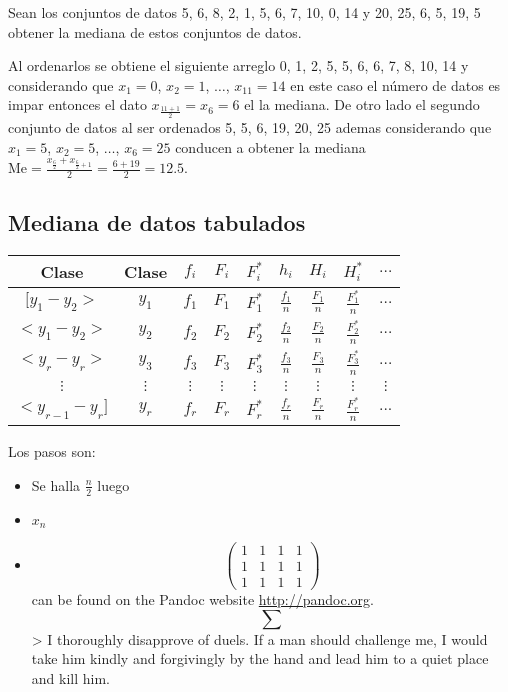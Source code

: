 \documentclass[10pt,]{krantz}
\providecommand{\tightlist}{%
  \setlength{\itemsep}{0pt}\setlength{\parskip}{0pt}}
\theoremstyle{definition}
\theoremstyle{definition}
\theoremstyle{definition}
\theoremstyle{remark}
\let\BeginKnitrBlock\begin \let\EndKnitrBlock\end
\begin{document}
\BeginKnitrBlock{exercise}
\protect\hypertarget{exr:unnamed-chunk-7}{}{\label{exr:unnamed-chunk-7} }Sean los conjuntos de datos 5, 6, 8, 2, 1, 5, 6, 7, 10, 0, 14 y 20, 25, 6, 5, 19, 5 obtener la mediana de estos conjuntos de datos.
\EndKnitrBlock{exercise}

\BeginKnitrBlock{solution}
\iffalse{} {Solución. } \fi{}Al ordenarlos se obtiene el siguiente arreglo 0, 1, 2, 5, 5, 6, 6, 7, 8, 10, 14 y considerando que \(x_1=0\), \(x_2=1\), \(\ldots\), \(x_{11}=14\) en este caso el número de datos es impar entonces el dato \(x_{\frac{11+1}{2}}=x_{6}=6\) el la mediana. De otro lado el segundo conjunto de datos al ser ordenados 5, 5, 6, 19, 20, 25 ademas considerando que \(x_1=5\), \(x_2=5\), \(\ldots\), \(x_6=25\) conducen a obtener la mediana \(\text{Me}=\frac{x_{\frac{6}{2}}+x_{\frac{6}{2}+1}}{2}=\frac{6+19}{2}=12.5\).
\EndKnitrBlock{solution}

\hypertarget{mediana-de-datos-tabulados}{%
\subsection{Mediana de datos tabulados}\label{mediana-de-datos-tabulados}}

\begin{longtable}[]{@{}ccccccccc@{}}
\toprule
Clase & Clase & \(f_i\) & \(F_i\) & \(F_i^*\) & \(h_i\) & \(H_i\) & \(H_i^*\) & \(\ldots\)\tabularnewline
\midrule
\endhead
\([y_1-y_2>\) & \(y_1\) & \(f_1\) & \(F_1\) & \(F_1^*\) & \(\frac{f_1}{n}\) & \(\frac{F_1}{n}\) & \(\frac{F_1^*}{n}\) & \(\ldots\)\tabularnewline
\(<y_1-y_2>\) & \(y_2\) & \(f_2\) & \(F_2\) & \(F_2^*\) & \(\frac{f_2}{n}\) & \(\frac{F_2}{n}\) & \(\frac{F_2^*}{n}\) & \(\ldots\)\tabularnewline
\(<y_{r}-y_r>\) & \(y_3\) & \(f_3\) & \(F_3\) & \(F_3^*\) & \(\frac{f_3}{n}\) & \(\frac{F_3}{n}\) & \(\frac{F_3^*}{n}\) & \(\ldots\)\tabularnewline
\(\vdots\) & \(\vdots\) & \(\vdots\) & \(\vdots\) & \(\vdots\) & \(\vdots\) & \(\vdots\) & \(\vdots\) & \(\vdots\)\tabularnewline
\(<y_{r-1}-y_r]\) & \(y_r\) & \(f_r\) & \(F_r\) & \(F_r^*\) & \(\frac{f_r}{n}\) & \(\frac{F_r}{n}\) & \(\frac{F_r^*}{n}\) & \(...\)\tabularnewline
\bottomrule
\end{longtable}

Los pasos son:

\begin{itemize}
\tightlist
\item
  Se halla \(\frac{n}{2}\) luego
\item
  \(x_n\)
\item
  \[ \begin{pmatrix}
  1&1&1&1\\
  1&1&1&1\\
  1&1&1&1
  \end{pmatrix}\]
  can be found on the Pandoc website \url{http://pandoc.org}.
  \[\sum\]
  \textgreater{} I thoroughly disapprove of duels. If a man should challenge me,
  I would take him kindly and forgivingly by the hand and lead him
  to a quiet place and kill him.
\end{itemize}
\end{document}
